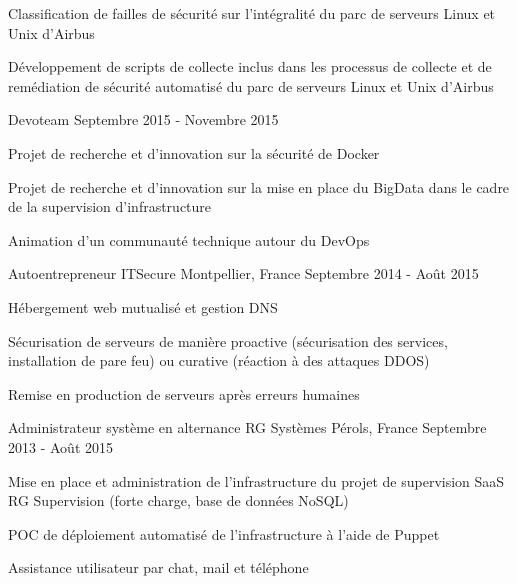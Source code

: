 \begin{cventries}
{\begin{cvsubentries}
{\begin{cvitems}
              \item {Classification de failles de sécurité sur l'intégralité du parc de serveurs Linux et Unix d'Airbus}
              \item {Développement de scripts de collecte inclus dans les processus de collecte et de remédiation de sécurité automatisé du parc de serveurs Linux et Unix d'Airbus}
            \end{cvitems}
          }
        \cvsubentry
          {}
          {Devoteam}
          {Septembre 2015 - Novembre 2015}
          {
            \begin{cvitems} %
              \item {Projet de recherche et d'innovation sur la sécurité de Docker}
              \item {Projet de recherche et d'innovation sur la mise en place du BigData dans le cadre de la supervision d'infrastructure}
              \item {Animation d'un communauté technique autour du DevOps}
            \end{cvitems}
          }
      \end{cvsubentries}
    }

  \cventry
    {Autoentrepreneur} %
    {ITSecure} %
    {Montpellier, France} %
    {Septembre 2014 - Août 2015} %
    {
      \begin{cvitems} %
        \item {Hébergement web mutualisé et gestion DNS}
        \item {Sécurisation de serveurs de manière proactive (sécurisation des services, installation de pare feu) ou curative (réaction à des attaques DDOS)}
        \item {Remise en production de serveurs après erreurs humaines}
      \end{cvitems}
    }

  \cventry
    {Administrateur système en alternance} %
    {RG Systèmes} %
    {Pérols, France} %
    {Septembre 2013 - Août 2015} %
    {
      \begin{cvitems} %
        \item {Mise en place et administration de l'infrastructure du projet de supervision SaaS RG Supervision (forte charge, base de données NoSQL)}
        \item {POC de déploiement automatisé de l'infrastructure à l'aide de Puppet}
        \item {Assistance utilisateur par chat, mail et téléphone}
      \end{cvitems}
    }


\end{cventries}
